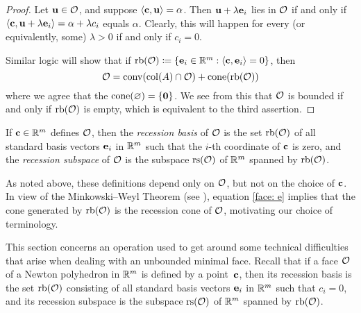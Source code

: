 \documentclass[11pt]{amsart}
\begin{document}
\begin{proof}
   Let $\mathbf{u} \in \mathcal{O}$, and suppose $\langle \mathbf{c}, \mathbf{u} \rangle = \alpha$.
   Then $\mathbf{u} + \lambda \mathbf{e}_i$ lies in $\mathcal{O}$ if and only if $\langle \mathbf{c}, \mathbf{u} + \lambda \mathbf{e}_i \rangle = \alpha + \lambda c_i$ equals $\alpha$.
   Clearly, this will happen for every (or equivalently, some) $\lambda > 0$ if and only if $c_i = 0$. 

Similar logic will show that if $\operatorname{rb}(\mathcal{O}) \coloneqq  \{ \mathbf{e}_i \in \mathbb{R}^m : \langle \mathbf{c}, \mathbf{e}_i \rangle = 0\}$, then
\begin{equation}
\label{face: e}
\mathcal{O} =  \operatorname{conv}( \operatorname{col}(A) \cap \mathcal{O} ) + \operatorname{cone}(\operatorname{rb}(\mathcal{O}))
\end{equation}
where we agree that the $\operatorname{cone}(\varnothing) = \{\mathbf{0}\}$.  We see from this that $\mathcal{O}$ is bounded if and only if $\operatorname{rb}(\mathcal{O})$ is empty, which is equivalent to the third assertion.
\end{proof}

\begin{definition}
   If $\mathbf{c} \in \mathbb{R}^m$ defines $\mathcal{O}$, then the \emph{recession basis} of $\mathcal{O}$ is the set $\operatorname{rb}(\mathcal{O})$ of all standard basis vectors $\mathbf{e}_i$ in $\mathbb{R}^m$ such that the $i$-th coordinate of $\mathbf{c}$ is zero, and the \emph{recession subspace} of $\mathcal{O}$ is the subspace $\operatorname{rs}(\mathcal{O})$ of $\mathbb{R}^m$ spanned by $\operatorname{rb}(\mathcal{O})$.
\end{definition}

As noted above, these definitions depend only on $\mathcal{O}$, but not on the choice of $\mathbf{c}$.
In view of the Minkowski--Weyl Theorem (see ), equation \eqref{face: e} implies that the cone generated by $\operatorname{rb}(\mathcal{O})$ is the recession cone of $\mathcal{O}$, motivating our choice of terminology.



This section concerns an operation used to get around some technical difficulties that arise when dealing with an unbounded minimal face.
Recall that if a face $\mathcal{O}$ of a Newton polyhedron in $\mathbb{R}^m$ is defined by a point~$\mathbf{c}$, then its recession basis is the set $\operatorname{rb}(\mathcal{O})$ consisting of all standard basis vectors $\mathbf{e}_i$ in $\mathbb{R}^m$ such that $c_i = 0$, and its recession subspace is the subspace $\operatorname{rs}(\mathcal{O})$ of $\mathbb{R}^m$ spanned by $\operatorname{rb}(\mathcal{O})$.
\end{document}
